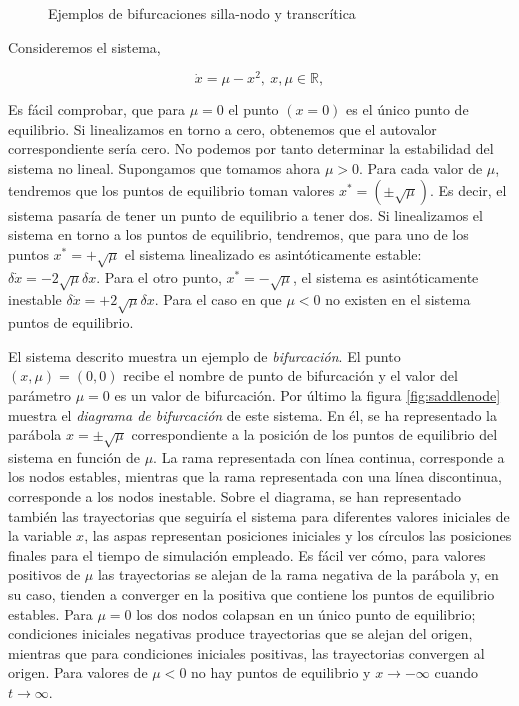 \begin{example}
\begin{figure}
\label{fig:saddlenode}
\label{fig:trans}
\caption{Ejemplos de bifurcaciones silla-nodo y transcrítica}
\end{figure}
Consideremos el sistema,

\begin{equation*}
\dot x = \mu - x^2,\  x, \mu \in \mathbb{R},  
\end{equation*}

Es fácil comprobar, que para $\mu =0$ el punto $(x = 0)$ es el único punto de equilibrio. Si linealizamos en torno a cero, obtenemos que el autovalor correspondiente sería cero.  No podemos por tanto determinar la estabilidad del sistema no lineal. Supongamos que tomamos ahora $\mu > 0$. Para cada valor de $\mu$, tendremos que los puntos de equilibrio toman valores $x^* = ( \pm \sqrt{\mu})$. Es decir, el sistema pasaría de tener un punto de equilibrio a tener dos. Si linealizamos el sistema en torno a los puntos de equilibrio, tendremos, que para uno de los puntos $x^*=+\sqrt{\mu}$ el sistema linealizado es asintóticamente estable: $ \delta\dot{x} = -2\sqrt{\mu}\delta x$. Para el otro punto, $x^*=-\sqrt{\mu}$, el sistema es asintóticamente inestable $ \delta \dot{x} = +2\sqrt{\mu}\delta x$.
Para el caso en 	que $\mu<0$ no existen en el sistema puntos de equilibrio.

El sistema descrito muestra un ejemplo de \emph{bifurcación}. El punto $(x,\mu)=(0,0)$ recibe el nombre de punto de bifurcación y el valor del parámetro $\mu = 0$ es un valor de bifurcación. Por último la figura \ref{fig:saddlenode} muestra el \emph{diagrama de bifurcación} de este sistema. En él, se ha representado la parábola $x=\pm \sqrt{\mu}$ correspondiente a la posición de los puntos de equilibrio del sistema en función de $\mu$. La rama representada con línea continua, corresponde a los nodos estables, mientras que la rama representada con una línea discontinua, corresponde a los nodos inestable. Sobre el diagrama, se han representado también las trayectorias que seguiría el sistema para diferentes valores iniciales de la variable $x$, las  aspas representan posiciones iniciales y los círculos las posiciones finales para el tiempo de simulación empleado. Es fácil ver cómo, para valores positivos de $\mu$  las trayectorias se alejan de la rama negativa de la parábola y, en su caso, tienden a converger en la positiva que contiene los puntos de equilibrio estables. Para $\mu =0$ los dos nodos colapsan en un único punto de equilibrio; condiciones iniciales negativas produce trayectorias que se alejan del origen, mientras que para condiciones iniciales positivas, las trayectorias convergen al origen. Para valores de $\mu<0$ no hay puntos de equilibrio y $x\to -\infty$ cuando $t\to \infty$.


\end{example}
